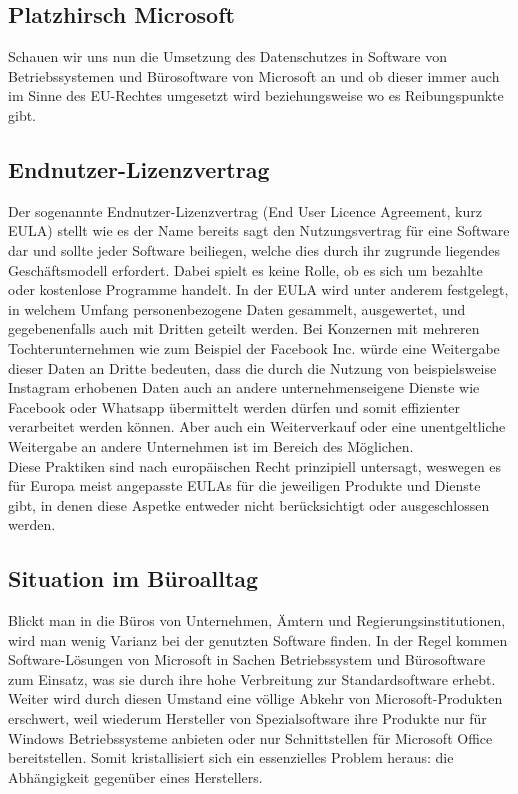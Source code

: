 \subsection{Platzhirsch Microsoft}
Schauen wir uns nun die Umsetzung des Datenschutzes in Software von Betriebssystemen und Bürosoftware von Microsoft an und ob dieser immer auch im Sinne des EU-Rechtes umgesetzt wird beziehungsweise wo es Reibungspunkte gibt.

\subsection{Endnutzer-Lizenzvertrag}
Der sogenannte Endnutzer-Lizenzvertrag (\glqq End User Licence Agreement\grqq{}, kurz EULA) stellt wie es der Name bereits sagt den Nutzungsvertrag für eine Software dar und sollte jeder Software beiliegen, welche dies durch ihr zugrunde liegendes Geschäftsmodell erfordert. Dabei spielt es keine Rolle, ob es sich um bezahlte oder kostenlose Programme handelt. In der EULA wird unter anderem festgelegt, in welchem Umfang personenbezogene Daten gesammelt, ausgewertet, und gegebenenfalls auch mit Dritten geteilt werden. Bei Konzernen mit mehreren Tochterunternehmen wie zum Beispiel der Facebook Inc. würde eine Weitergabe dieser Daten an Dritte bedeuten, dass die durch die Nutzung von beispielsweise Instagram erhobenen Daten auch an andere unternehmenseigene Dienste wie Facebook oder Whatsapp übermittelt werden dürfen und somit effizienter verarbeitet werden können. Aber auch ein Weiterverkauf oder eine unentgeltliche Weitergabe an andere Unternehmen ist im Bereich des Möglichen.\\
Diese Praktiken sind nach europäischen Recht prinzipiell untersagt, weswegen es für Europa meist angepasste EULAs für die jeweiligen Produkte und Dienste gibt, in denen diese Aspetke entweder nicht berücksichtigt oder ausgeschlossen werden.

\subsection{Situation im Büroalltag}
Blickt man in die Büros von Unternehmen, Ämtern und Regierungsinstitutionen, wird man wenig Varianz bei der genutzten Software finden. In der Regel kommen Software-Lösungen von Microsoft in Sachen Betriebssystem und Bürosoftware zum Einsatz, was sie durch ihre hohe Verbreitung zur Standardsoftware erhebt. Weiter wird durch diesen Umstand eine völlige Abkehr von Microsoft-Produkten erschwert, weil wiederum Hersteller von Spezialsoftware ihre Produkte nur für Windows Betriebssysteme anbieten oder nur Schnittstellen für Microsoft Office bereitstellen. Somit kristallisiert sich ein essenzielles Problem heraus: die Abhängigkeit gegenüber eines Herstellers.


